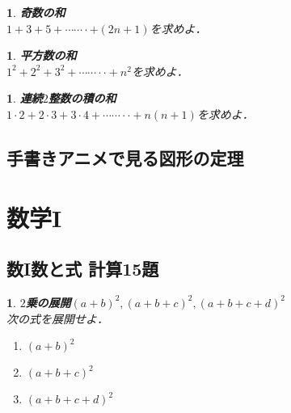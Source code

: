 \documentclass[10pt,
fleqn,
dvipdfmx,
uplatex
]{jsarticle}
\newtheorem{question}[Question]{}
\begin{document}
\begin{question}{\bf\boldmath 奇数の和}\\
$1+3+5+\cdots \cdots \cdot +\left(2n+1\right)$を求めよ．
\end{question}



\begin{question}{\bf\boldmath 平方数の和}\\
$1^2+2^2+3^2+\cdots \cdots \cdot \cdot +n^2$を求めよ．
\end{question}



\begin{question}{\bf\boldmath 連続$2$整数の積の和}\\
$1\cdot 2+2\cdot 3+3\cdot 4+\cdots \cdots \cdot \cdot +n\left(n+1\right)$を求めよ．
\end{question}

\subsection{手書きアニメで見る図形の定理}











\section{数学I}

\subsection{数I数と式 計算15題}



\begin{question}{\bf\boldmath $2$乗の展開$\left(a+b\right)^2,\left(a+b+c\right)^2,\left(a+b+c+d\right)^2$}\\
次の式を展開せよ．
\begin{enumerate}
\item $\left(a+b\right)^2$
\item $\left(a+b+c\right)^2$
\item $\left(a+b+c+d\right)^2$
\end{enumerate}

\end{question}
\end{document}
